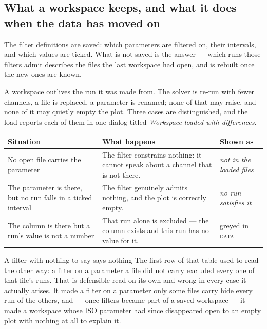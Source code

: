 \documentclass[11pt,a4paper,oneside]{report}
\newcommand{\tab}[1]{\textsc{#1}}
\begin{document}
\subsection{What a workspace keeps, and what it does when the data has moved on}

The filter definitions are saved: which parameters are filtered on, their
intervals, and which values are ticked. What is not saved is the answer --- which
runs those filters admit describes the files the last workspace had open, and is
rebuilt once the new ones are known.

A workspace outlives the run it was made from. The solver is re-run with fewer
channels, a file is replaced, a parameter is renamed; none of that may raise, and
none of it may quietly empty the plot. Three cases are distinguished, and the
load reports each of them in one dialog titled \emph{Workspace loaded with
differences}.

\begin{center}
\small
\begin{tabular}{@{}p{}p{}p{}@{}}
\toprule
\textbf{Situation} & \textbf{What happens} & \textbf{Shown as} \\
\midrule
No open file carries the parameter & The filter constrains nothing: it cannot speak about a channel that is not there. & \emph{not in the loaded files} \\
\addlinespace
The parameter is there, but no run falls in a ticked interval & The filter genuinely admits nothing, and the plot is correctly empty. & \emph{no run satisfies it} \\
\addlinespace
The column is there but a run's value is not a number & That run alone is excluded --- the column exists and this run has no value for it. & greyed in \tab{data} \\
\bottomrule
\end{tabular}
\end{center}

\begin{aoenote}{A filter with nothing to say says nothing}
The first row of that table used to read the other way: a filter on a parameter a
file did not carry excluded every one of that file's runs. That is defensible
read on its own and wrong in every case it actually arises. It made a filter on a
parameter only some files carry hide every run of the others, and --- once
filters became part of a saved workspace --- it made a workspace whose ISO
parameter had since disappeared open to an empty plot with nothing at all to
explain it.
\end{aoenote}
\end{document}
